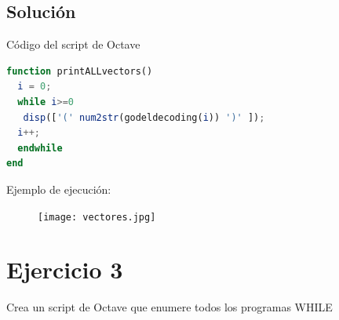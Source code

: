 \documentclass{article}
\begin{document}
\subsection*{Solución}
Código del script de Octave
\begin{lstlisting}[language=Octave]
function printALLvectors()
  i = 0;
  while i>=0
   disp(['(' num2str(godeldecoding(i)) ')' ]);
  i++;
  endwhile
end

\end{lstlisting}
Ejemplo de ejecución: \\
\begin{figure}[h]
    \centering
    \texttt{[image: vectores.jpg]}
\end{figure}
\section*{Ejercicio 3}
Crea un script de Octave que enumere todos los programas WHILE
\end{document}
